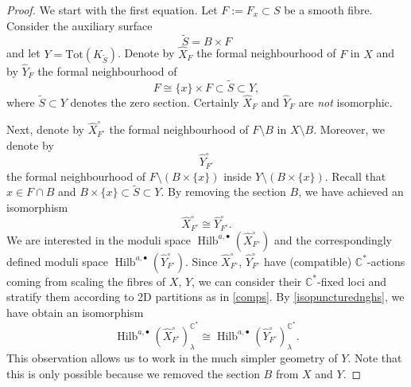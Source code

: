 \documentclass{amsart}
\theoremstyle{definition}
\newcommand{\CC} {\mathbb{C}}          %
\newcommand{\Hilb}{\operatorname{Hilb}}
\begin{document}
\begin{proof}
We start with the first equation. Let $F := F_x \subset S$ be a smooth fibre. Consider the auxiliary surface 
$$
\tilde{S} = B \times F
$$ 
and let $Y = \mathrm{Tot}(K_{\tilde{S}})$. 
Denote by $\widehat{X}_F$ the formal neighbourhood of $F$ in $X$ and by $\widehat{Y}_{F}$ the formal neighbourhood of
$$
F \cong \{x\} \times F \subset \tilde{S} \subset Y,
$$
where $\tilde{S} \subset Y$ denotes the zero section. Certainly $\widehat{X}_F$ and $\widehat{Y}_{F}$ are \emph{not} isomorphic. 

Next, denote by $\widehat{X}^{\circ}_{F^\circ}$ the formal neighbourhood of $F \setminus B$ in $X \setminus B$. Moreover, we denote by 
$$
\widehat{Y}_{F^{\circ}}^{\circ}
$$
the formal neighbourhood of $F \setminus (B \times \{x\})$ inside $Y \setminus (B \times \{x\})$. Recall that $x \in F \cap B$ and $B \times \{x\} \subset \tilde{S} \subset Y$. By removing the section $B$, we have achieved an isomorphism  
\begin{equation} \label{isopuncturednghs}
\widehat{X}^{\circ}_{F^\circ} \cong \widehat{Y}_{F^{\circ}}^{\circ}.
\end{equation}
We are interested in the moduli space $\Hilb^{a,\bullet}(\widehat{X}^{\circ}_{F^\circ})$ and the correspondingly defined moduli space $\Hilb^{a,\bullet}(\widehat{Y}^{\circ}_{F^\circ})$. Since $\widehat{X}^{\circ}_{F^\circ}$, $\widehat{Y}^{\circ}_{F^\circ}$ have (compatible) $\CC^*$-actions coming from scaling the fibres of $X$, $Y$, we can consider their $\CC^*$-fixed loci and stratify them according to 2D partitions as in \eqref{comps}. By \eqref{isopuncturednghs}, we have obtain an isomorphism   
$$
\Hilb^{a,\bullet}(\widehat{X}^{\circ}_{F^\circ})_{\lambda}^{\CC^*} \cong \Hilb^{a,\bullet}(\widehat{Y}^{\circ}_{F^\circ})_{\lambda}^{\CC^*}.
$$
This observation allows us to work in the much simpler geometry of $Y$. Note that this is only possible because we removed the section $B$ from $X$ and $Y$.


\end{proof}
\end{document}
